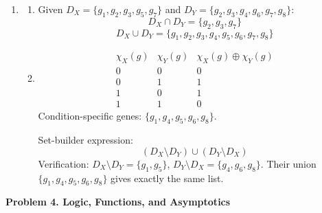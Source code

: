 \documentclass[12pt]{article}
\begin{document}
\begin{enumerate}
    \item [(a)]
    \begin{enumerate}
        \item [i.]
        Given $D_X = \{g_1,g_2,g_3,g_5,g_7\}$ and $D_Y = \{g_2,g_3,g_4,g_6,g_7,g_8\}$:
        \[
        D_X\cap D_Y = \{g_2,g_3,g_7\}
        \]
        \[
        D_X\cup D_Y = \{g_1,g_2,g_3,g_4,g_5,g_6,g_7,g_8\}
        \]
        
        \item[ii.]
        \[
        \begin{array}{cc|c}
        \chi_X(g) & \chi_Y(g) & \chi_X(g)\oplus\chi_Y(g) \\
        \hline
        0 & 0 & 0 \\
        0 & 1 & 1 \\
        1 & 0 & 1 \\
        1 & 1 & 0
        \end{array}
        \]
        Condition-specific genes: $\{g_1,g_4,g_5,g_6,g_8\}$.

        Set-builder expression:
        \[
        (D_X \setminus D_Y)\cup(D_Y\setminus D_X)
        \]
        Verification:
        $D_X\setminus D_Y=\{g_1,g_5\}$, $D_Y\setminus D_X=\{g_4,g_6,g_8\}$.
        Their union $\{g_1,g_4,g_5,g_6,g_8\}$ gives exactly the same list.
    \end{enumerate}
\end{enumerate}





\textbf{Problem 4. Logic, Functions, and Asymptotics}
\end{document}
